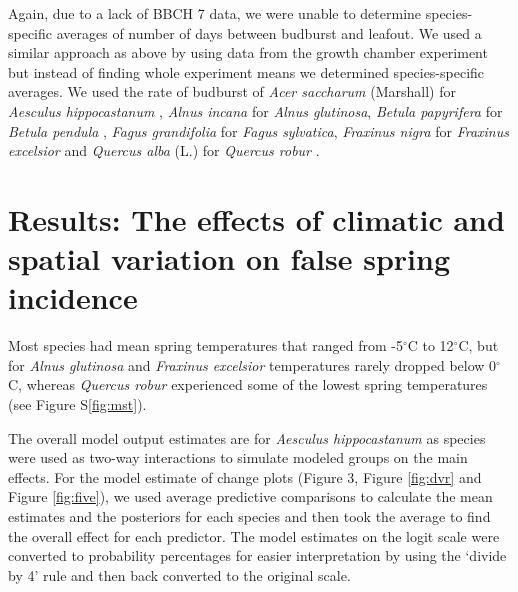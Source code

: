 \documentclass{article}\usepackage[]{graphicx}\usepackage[]{color}
\begin{document}
{Again, due to a lack of BBCH 7 data, we were unable to determine species-specific averages of number of days between budburst and leafout. We used a similar approach as above by using data from the growth chamber experiment \citep{Flynn2018} but instead of finding whole experiment means we determined species-specific averages. We used the rate of budburst of \textit{Acer saccharum} (Marshall) for \textit{Aesculus hippocastanum} \citep{Buerki2010}, \textit{Alnus incana} for \textit{Alnus glutinosa}, \textit{Betula papyrifera} for \textit{Betula pendula} \citep{Wang2016}, \textit{Fagus grandifolia} for \textit{Fagus sylvatica}, \textit{Fraxinus nigra} for \textit{Fraxinus excelsior} and \textit{Quercus alba} (L.) for \textit{Quercus robur} \citep{Hipp2017}.

\section*{Results: The effects of climatic and spatial variation on false spring incidence}
Most species had mean spring temperatures that ranged from -5$^{\circ}$C to 12$^{\circ}$C, but for \textit{Alnus glutinosa} and \textit{Fraxinus excelsior} temperatures rarely dropped below 0$^{\circ}$C, whereas \textit{Quercus robur} experienced some of the lowest spring temperatures (see Figure S\ref{fig:mst}). 

The overall model output estimates are for \textit{Aesculus hippocastanum} as species were used as two-way interactions to simulate modeled groups on the main effects. For the model estimate of change plots (Figure 3, Figure \ref{fig:dvr} and Figure \ref{fig:five}), we used average predictive comparisons to calculate the mean estimates and the posteriors for each species and then took the average to find the overall effect for each predictor. The model estimates on the logit scale were converted to probability percentages for easier interpretation by using the `divide by 4' rule \citep{Gelman2006} and then back converted to the original scale. %

}
\end{document}
